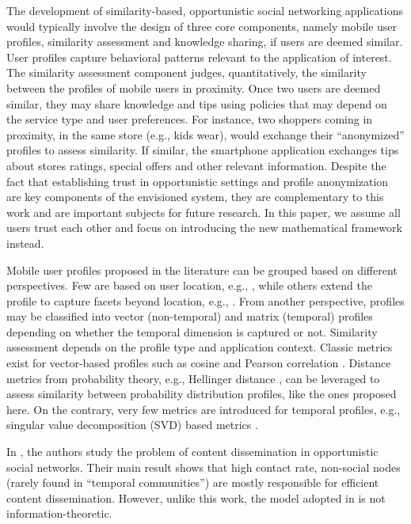 \documentclass[12pt,epsf]{article}
\theoremstyle{definition}
\begin{document}
The development of similarity-based, opportunistic social networking 
applications would typically involve the design of three core 
components, namely mobile user profiles, similarity assessment and knowledge 
sharing, if users are deemed similar. User profiles capture behavioral patterns relevant to 
the application of interest. The similarity assessment component judges, quantitatively, 
the similarity between the profiles of mobile users in proximity. 
Once two users are deemed similar, 
they may share knowledge and tips using policies that may depend on 
the service type and user preferences. For instance, two shoppers coming in 
proximity, in the same store (e.g., kids wear), would exchange their 
``anonymized'' profiles to assess similarity. If similar, the  
smartphone application exchanges tips about stores ratings, special offers 
and other relevant information. Despite the fact that establishing trust in opportunistic 
settings \cite{trust} and profile anonymization are key components of the envisioned 
system, they are complementary to this work and are important subjects for future 
research. In this paper, we assume all users trust each other and focus on introducing 
the new mathematical framework instead.

Mobile user profiles proposed in the literature can be grouped
based on different perspectives. Few are based on user location, e.g., 
\cite{profilecast,csi}, while others extend the profile to capture facets
beyond location, e.g., \cite{uspatent,mogh}. From another 
perspective, profiles may be classified into vector (non-temporal) and matrix 
(temporal) profiles depending on whether the temporal dimension is captured or not.
Similarity assessment depends on the profile type and application context.
Classic metrics exist for vector-based profiles such as cosine and Pearson correlation
\cite{sim}. Distance metrics from probability theory, 
e.g., Hellinger distance \cite{sm}, can be leveraged to assess similarity between 
probability distribution profiles, like the ones proposed here. On the contrary, 
very few metrics are introduced for temporal profiles, e.g., singular value 
decomposition (SVD) based metrics \cite{csi}.

In \cite{mobihoc}, the authors study the problem of content dissemination in 
opportunistic social networks. Their main result shows that high contact rate, 
non-social nodes (rarely found in ``temporal communities'') are mostly responsible 
for efficient content dissemination. However, unlike this work, the model
adopted in \cite{mobihoc} is not information-theoretic.
\end{document}
